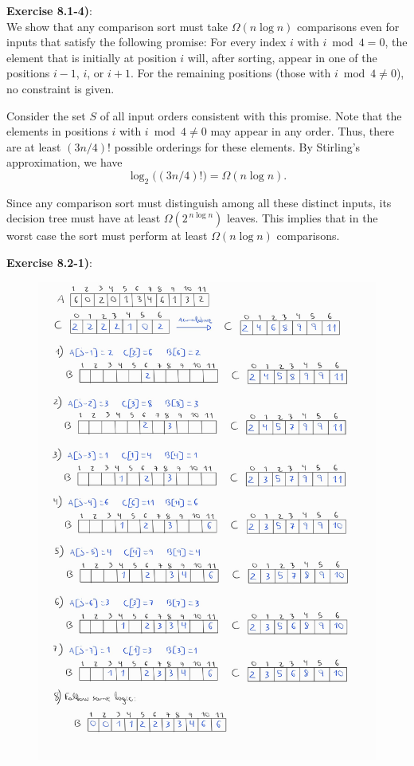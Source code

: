 \documentclass{article}
\newcounter{exercise}[section]   %
\begin{document}
\textbf{Exercise 8.1-4)}:\\
We show that any comparison sort must take 
\(\Omega(n\log n)\) comparisons even for inputs that satisfy the following 
promise: For every index \(i\) with \(i \bmod 4 = 0\), the element that is 
initially at position \(i\) will, after sorting, appear in one of the positions 
\(i-1\), \(i\), or \(i+1\). For the remaining positions (those with \(i \bmod 4 
\neq 0\)), no constraint is given.

Consider the set \(S\) of all input orders consistent with this promise. Note 
that the elements in positions \(i\) with \(i \bmod 4 \neq 0\) may appear in 
any order. Thus, there are at least \((3n/4)!\) possible orderings for these 
elements. By Stirling's approximation, we have
\[
\log_2\bigl((3n/4)!\bigr)=\Omega(n\log n).
\]

Since any comparison sort must distinguish among all these distinct inputs, 
its decision tree must have at least \(\Omega(2^{\,n\log n})\) leaves. This 
implies that in the worst case the sort must perform at least 
\(\Omega(n\log n)\) comparisons.

\newpage
{}
\textbf{Exercise 8.2-1)}:
\begin{figure}[h]
    \centering
    \includegraphics[scale=0.25]{Problem8_2_1.jpeg}
\end{figure}
\end{document}
